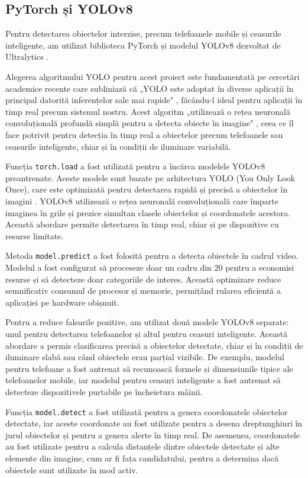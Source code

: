 \documentclass[12pt,a4paper]{article}
\begin{document}
\subsection{PyTorch și YOLOv8}
Pentru detectarea obiectelor interzise, precum telefoanele mobile și ceasurile inteligente, am utilizat biblioteca PyTorch \cite{pytorch} și modelul YOLOv8 dezvoltat de Ultralytics \cite{ultralytics}. 

Alegerea algoritmului YOLO pentru acest proiect este fundamentată pe cercetări academice recente care 
subliniază că „YOLO este adoptat în diverse aplicații în principal datorită inferențelor sale mai 
rapide" \cite{yolo_research}, făcându-l ideal pentru aplicații în timp real precum sistemul nostru. 
Acest algoritm „utilizează o rețea neuronală convoluțională profundă simplă pentru a detecta obiecte 
în imagine" \cite{yolo_algorithm}, ceea ce îl face potrivit pentru detecția în timp real a obiectelor precum 
telefoanele sau ceasurile inteligente, chiar și în condiții de iluminare variabilă.

Funcția \texttt{torch.load} a fost utilizată pentru a încărca modelele YOLOv8 preantrenate. Aceste modele sunt bazate pe arhitectura YOLO (You Only Look Once), care este optimizată pentru detectarea rapidă și precisă a obiectelor în imagini \cite{academic3}. YOLOv8 utilizează o rețea neuronală convoluțională care împarte imaginea în grile și prezice simultan clasele obiectelor și coordonatele acestora. Această abordare permite detectarea în timp real, chiar și pe dispozitive cu resurse limitate.

Metoda \texttt{model.predict} a fost folosită pentru a detecta obiectele în cadrul video. Modelul a fost configurat să proceseze doar un cadru din 20 pentru a economisi resurse și să detecteze doar categoriile de interes. Această optimizare reduce semnificativ consumul de procesor și memorie, permițând rularea eficientă a aplicației pe hardware obișnuit.

Pentru a reduce falsurile pozitive, am utilizat două modele YOLOv8 separate: unul pentru detectarea telefoanelor și altul pentru ceasuri inteligente. Această abordare a permis clasificarea precisă a obiectelor detectate, chiar și în condiții de iluminare slabă sau când obiectele erau parțial vizibile. De exemplu, modelul pentru telefoane a fost antrenat să recunoască formele și dimensiunile tipice ale telefoanelor mobile, iar modelul pentru ceasuri inteligente a fost antrenat să detecteze dispozitivele purtabile pe încheietura mâinii.

Funcția \texttt{model.detect} a fost utilizată pentru a genera coordonatele obiectelor detectate, iar aceste coordonate au fost utilizate pentru a desena dreptunghiuri în jurul obiectelor și pentru a genera alerte în timp real. De asemenea, coordonatele au fost utilizate pentru a calcula distanțele dintre obiectele detectate și alte elemente din imagine, cum ar fi fața candidatului, pentru a determina dacă obiectele sunt utilizate în mod activ.
\end{document}
